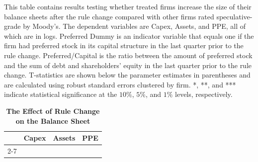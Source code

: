 \documentclass[a4paper, 12pt]{article}
\begin{document}
\begin{table}[htbp]
\caption{\textbf{The Effect of Rule Change on the Balance Sheet}} \label{table_bs_all}
\begin{singlespace}
\begin{small}

\noindent This table contains results testing whether treated firms increase the size of their balance sheets after the rule change compared with other firms rated speculative-grade by Moody's. The dependent variables are Capex, Assets, and PPE, all of which are in logs. Preferred Dummy is an indicator variable that equals one if the firm had preferred stock in its capital structure in the last quarter prior to the rule change. Preferred/Capital is the ratio between the amount of preferred stock and the sum of debt and shareholders' equity in the last quarter prior to the rule change.  T-statistics are shown below the parameter estimates in parentheses and are calculated using robust standard errors clustered by firm. *, **, and *** indicate statistical significance at the $10\%$, $5\%$, and $1\%$ levels, respectively.

\end{small}
\end{singlespace}
\vspace{3mm}
\small
  \centering
    \begin{tabular}{lcccccc}
    \toprule
    \textbf{ } &
      \multicolumn{2}{c}{\textbf{Capex}} &  \multicolumn{2}{c}{\textbf{Assets}} &
      \multicolumn{2}{c}{\textbf{PPE}}
      \\
      \cline{2-7}





    \bottomrule
    \end{tabular}
\end{table}
\clearpage

\newpage
\end{document}
